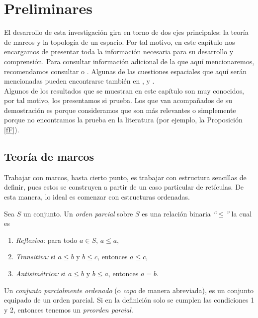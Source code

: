 \chapter{Preliminares}\label{Preliminares}

El desarrollo de esta investigación gira en torno de dos ejes principales: la teoría de marcos y la topología de un espacio. 
Por tal motivo, en este capítulo nos encargamos de presentar toda la información necesaria para su desarrollo y comprensión.
Para consultar información adicional de la que aquí mencionaremos, recomendamos consultar \cite{P.T.} o \cite{J.P.}. 
Algunas de las cuestiones espaciales que aquí serán mencionadas pueden encontrarse también en \cite{R.S.}, \cite{R.S.2} y \cite{R.S.3}.\\

Algunos de los resultados que se muestran en este capítulo son muy conocidos, por tal motivo, los presentamos si prueba. 
Los que van acompañados de su demostración es porque consideramos que son más relevantes o simplemente porque no encontramos la prueba 
en la literatura (por ejemplo, la Proposición \ref{fF}).

\section{Teoría de marcos}\label{marcos}

Trabajar con marcos, hasta cierto punto, es trabajar con estructura sencillas de definir, pues estos se construyen a partir de un caso particular de retículas. De esta manera, 
lo ideal es comenzar con estructuras ordenadas.

\begin{dfn}\label{Copo}
Sea $S$ un conjunto. Un \emph{orden parcial} sobre $S$ es una relación binaria \emph{``$\leq$''} la cual es 
\begin{enumerate}
\item \emph{Reflexiva:} para todo $a\in S$, $a\leq a$,
\item \emph{Transitiva:} si $a\leq b$ y $b\leq c$, entonces $a\leq c$,
\item \emph{Antisimétrica:} si $a\leq b$ y $b\leq a$, entonces $a=b$. 
\end{enumerate}
Un \emph{conjunto parcialmente ordenado} (o \emph{copo} de manera abreviada), es un conjunto equipado de un orden parcial. Si en la definición solo se cumplen las condiciones 1 y 2, entonces tenemos un \emph{preorden parcial}.
\end{dfn}

